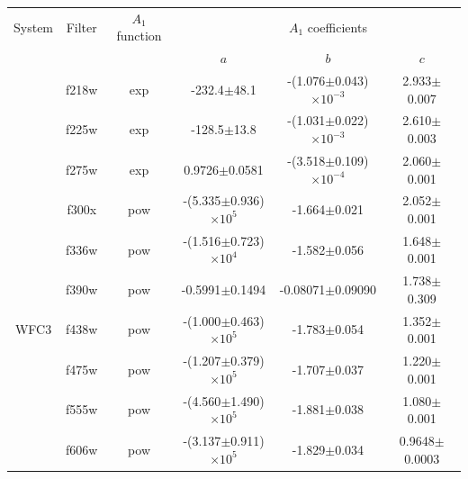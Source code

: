 \documentclass[12pt, a4paper]{report}
\begin{document}
\begin{table}
\begin{center}
\begin{tabular}{cccccc}
\hline
System & Filter & $A_{1}$ function & & $A_{1}$ coefficients & \\
 & & & $a$ & $b$ & $c$ \\
\hline
& f218w & exp & -232.4$\pm$48.1 & -(1.076$\pm$0.043)$\times 10^{-3}$ & 2.933$\pm$0.007 \\
& f225w & exp & -128.5$\pm$13.8 & -(1.031$\pm$0.022)$\times 10^{-3}$ & 2.610$\pm$0.003 \\
& f275w & exp & 0.9726$\pm$0.0581 & -(3.518$\pm$0.109)$\times 10^{-4}$ & 2.060$\pm$0.001 \\
& f300x & pow & -(5.335$\pm$0.936)$\times 10^{5}$ & -1.664$\pm$0.021 & 2.052$\pm$0.001 \\
& f336w & pow & -(1.516$\pm$0.723)$\times 10^{4}$ & -1.582$\pm$0.056 & 1.648$\pm$0.001 \\
& f390w & pow & -0.5991$\pm$0.1494 & -0.08071$\pm$0.09090 & 1.738$\pm$0.309 \\
WFC3 & f438w & pow & -(1.000$\pm$0.463)$\times 10^{5}$ & -1.783$\pm$0.054 & 1.352$\pm$0.001 \\
& f475w & pow & -(1.207$\pm$0.379)$\times 10^{5}$ & -1.707$\pm$0.037 & 1.220$\pm$0.001 \\
& f555w & pow & -(4.560$\pm$1.490)$\times 10^{5}$ & -1.881$\pm$0.038 & 1.080$\pm$0.001 \\
& f606w & pow & -(3.137$\pm$0.911)$\times 10^{5}$ & -1.829$\pm$0.034 & 0.9648$\pm$0.0003 \\

\end{tabular}
\end{center}
\end{table}
\end{document}
